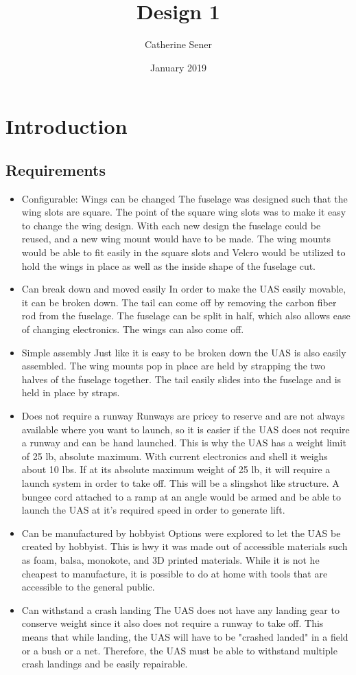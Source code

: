 \documentclass{report}
\title{Design 1}
\author{Catherine Sener}
\date{January 2019}
\begin{document}
\maketitle
\tableofcontents

\chapter{Introduction}
\section{Requirements}
\begin{itemize}
    \item Configurable: Wings can be changed
    \subitem The fuselage was designed such that the wing slots are square. The point of the square wing slots was to make it easy to change the wing design. With each new design the fuselage could be reused, and a new wing mount would have to be made. The wing mounts would be able to fit easily in the square slots and Velcro would be utilized to hold the wings in place as well as the inside shape of the fuselage cut. 
    \item Can break down and moved easily
    \subitem In order to make the UAS easily movable, it can be broken down. The tail can come off by removing the carbon fiber rod from the fuselage. The fuselage can be split in half, which also allows ease of changing electronics. The wings can also come off.
    \item Simple assembly
    Just like it is easy to be broken down the UAS is also easily assembled. The wing mounts pop in place are held by strapping the two halves of the fuselage together. The tail easily slides into the fuselage and is held in place by straps.
    \item Does not require a runway
    \subitem Runways are pricey to reserve and are not always available where you want to launch, so it is easier if the UAS does not require a runway and can be hand launched. This is why the UAS has a weight limit of 25 lb, absolute maximum. With current electronics and shell it weighs about 10 lbs. If at its absolute maximum weight of 25 lb, it will require a launch system in order to take off. This will be a slingshot like structure. A bungee cord attached to a ramp at an angle would be armed and be able to launch the UAS at it's required speed in order to generate lift. 
    \item Can be manufactured by hobbyist
    \subitem Options were explored to let the UAS be created by hobbyist. This is hwy it was made out of accessible materials such as foam, balsa, monokote, and 3D printed materials. While it is not he cheapest to manufacture, it is possible to do at home with tools that are accessible to the general public.
    \item Can withstand a crash landing
    \subitem The UAS does not have any landing gear to conserve weight since it also does not require a runway to take off. This means that while landing, the UAS will have to be "crashed landed" in a field or a bush or a net. Therefore, the UAS must be able to withstand multiple crash landings and be easily repairable. 
\end{itemize}
\end{document}
